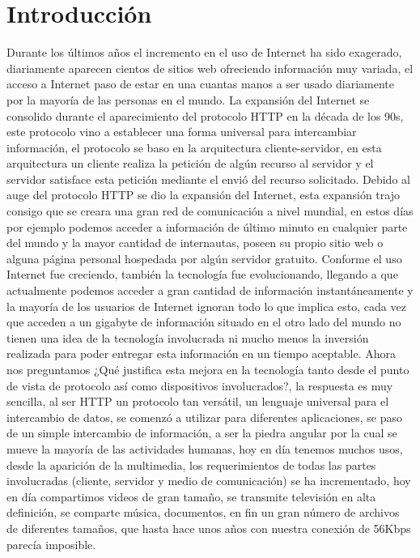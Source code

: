 
\chapter{Introducción} %

\label{ch:introduction} %


Durante los últimos años el incremento en el uso de Internet ha sido exagerado, diariamente aparecen cientos de sitios web ofreciendo información muy variada, el acceso a Internet paso de estar en una cuantas manos a ser usado diariamente por la mayoría de las personas en el mundo. La expansión del Internet se consolido durante el aparecimiento del protocolo HTTP en la década de los 90s, este protocolo vino a establecer una forma universal para intercambiar información, el protocolo se baso en la arquitectura cliente-servidor, en esta arquitectura un cliente realiza la petición de algún recurso al servidor y el servidor satisface esta petición mediante el envió del recurso solicitado.
Debido al auge del protocolo HTTP se dio la expansión del Internet, esta expansión trajo consigo que se creara una gran red de comunicación a nivel mundial, en estos días por ejemplo podemos acceder a información de último minuto en cualquier parte del mundo y la mayor cantidad de internautas, poseen su propio sitio web o alguna página personal hospedada por algún servidor gratuito. Conforme el uso Internet fue creciendo, también la tecnología fue evolucionando, llegando a que actualmente podemos acceder a gran cantidad de información instantáneamente y la mayoría de los usuarios de Internet ignoran todo lo que implica esto, cada vez que acceden a un gigabyte de información situado en el otro lado del mundo no tienen una idea de la tecnología involucrada ni mucho menos la inversión realizada para poder entregar esta información en un tiempo aceptable.
Ahora nos preguntamos ¿Qué justifica esta mejora en la tecnología tanto desde el punto de vista de protocolo así como dispositivos involucrados?, la respuesta es muy sencilla, al ser HTTP un protocolo tan versátil, un lenguaje universal para el intercambio de datos, se comenzó a utilizar para diferentes aplicaciones, se paso de un simple intercambio de información, a ser la piedra angular por la cual se mueve la mayoría de las actividades humanas, hoy en día tenemos muchos usos, desde la aparición de la multimedia, los requerimientos de todas las partes involucradas (cliente, servidor y medio de comunicación) se ha incrementado, hoy en día compartimos videos de gran tamaño, se transmite televisión en alta definición, se comparte música, documentos, en fin un gran número de archivos de diferentes tamaños, que hasta hace unos años con nuestra conexión de 56Kbps parecía imposible.
